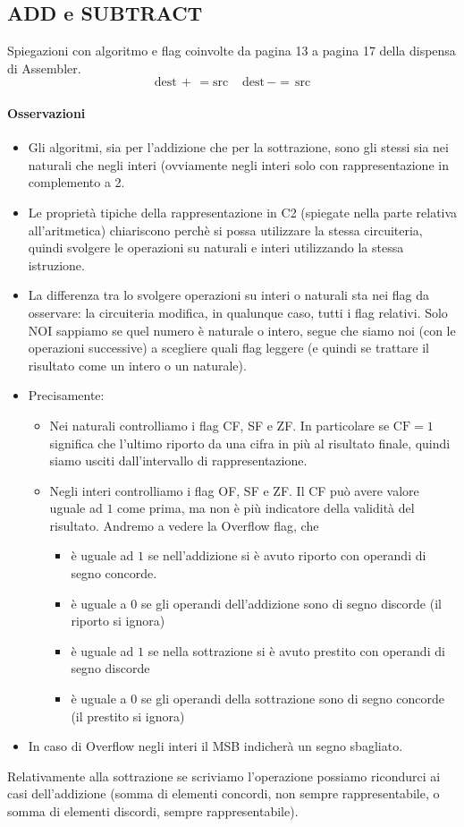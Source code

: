\documentclass[11pt]{report}
\begin{document}
\subsection{ADD e SUBTRACT}
Spiegazioni con algoritmo e flag coinvolte da pagina 13 a pagina 17 della dispensa di Assembler.
\[\boxed{\text{dest} \,+\,= \text{src}}\;\;\;\;\boxed{\text{dest}\, -= \,\text{src}}\]
\paragraph{Osservazioni} 
\begin{itemize}
\item Gli algoritmi, sia per l'addizione che per la sottrazione, sono gli stessi sia nei naturali che negli interi (ovviamente negli interi solo con rappresentazione in complemento a 2.
\item Le proprietà tipiche della rappresentazione in C2 (spiegate nella parte relativa all'aritmetica) chiariscono perchè si possa utilizzare la stessa circuiteria, quindi svolgere le operazioni su naturali e interi utilizzando la stessa istruzione.
\item La differenza tra lo svolgere operazioni su interi o naturali sta nei flag da osservare: la circuiteria modifica, in qualunque caso, tutti i flag relativi. Solo NOI sappiamo se quel numero è naturale o intero, segue che siamo noi (con le operazioni successive) a scegliere quali flag leggere (e quindi se trattare il risultato come un intero o un naturale).
\item Precisamente:
\begin{itemize}
\item Nei naturali controlliamo i flag CF, SF e ZF. In particolare se $\text{CF}=1$ significa che l'ultimo riporto da una cifra in più al risultato finale, quindi siamo usciti dall'intervallo di rappresentazione.
\item Negli interi controlliamo i flag OF, SF e ZF. Il CF può avere valore uguale ad $1$ come prima, ma non è più indicatore della validità del risultato. Andremo a vedere la Overflow flag, che
\begin{itemize}
\item è uguale ad $1$ se nell'addizione si è avuto riporto con operandi di segno concorde.
\item è uguale a $0$ se gli operandi dell'addizione sono di segno discorde (il riporto si ignora)
\item è uguale ad $1$ se nella sottrazione si è avuto prestito con operandi di segno discorde
\item è uguale a $0$ se gli operandi della sottrazione sono di segno concorde (il prestito si ignora)
\end{itemize}
\end{itemize}
\item In caso di Overflow negli interi il MSB indicherà un segno sbagliato.
\end{itemize}
Relativamente alla sottrazione se scriviamo l'operazione possiamo ricondurci ai casi dell'addizione (somma di elementi concordi, non sempre rappresentabile, o somma di elementi discordi, sempre rappresentabile).
\end{document}
